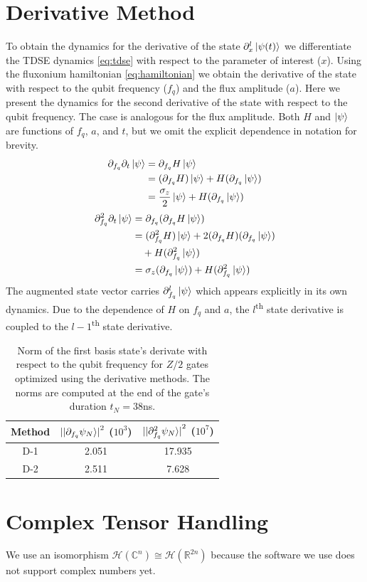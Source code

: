 \documentclass[
  amsfonts,
  amsmath,
  tbtags,
  amssymb,
  aps,
  nobibnotes,
  twocolumn,
  superscriptaddress,
]{revtex4-2}
\begin{document}
\section{Derivative Method}
To obtain the dynamics for the derivative of the state $\partial_{x}^{l} \ket{\psi(t)}$
we differentiate the TDSE dynamics \ref{eq:tdse} with respect to the parameter of interest
($x$). Using the fluxonium hamiltonian \ref{eq:hamiltonian} we obtain the derivative of the
state with respect to the qubit frequency ($f_{q}$) and the flux amplitude ($a$).
Here we present the dynamics for the second derivative of the state with respect to the
qubit frequency. The case is analogous for the flux amplitude. Both $H$ and $\ket{\psi}$ are functions
of $f_{q}$, $a$, and $t$, but we omit the explicit dependence in notation for
brevity.
\begin{equation}
  \begin{aligned}
      \partial_{f_{q}} \partial_{t} \ket{\psi} &= \partial_{f_{q}} H \ket{\psi}\\
      &= (\partial_{f_{q}} H) \ket{\psi} + H (\partial_{f_{q}} \ket{\psi})\\
      &= \frac{\sigma_{z}}{2} \ket{\psi} + H (\partial_{f_{q}} \ket{\psi})
  \end{aligned}
\end{equation}
\begin{equation}
  \begin{aligned}
    \partial_{f_{q}}^{2} \partial_{t} \ket{\psi} &= \partial_{f_{q}} (\partial_{f_{q}} H \ket{\psi})\\
    &= (\partial_{f_{q}}^{2} H) \ket{\psi} + 2 (\partial_{f_{q}} H)(\partial_{f_{q}} \ket{\psi})\\
    &\quad + H (\partial_{f_{q}}^{2} \ket{\psi})\\
    &= \sigma_{z} (\partial_{f_{q}} \ket{\psi}) + H (\partial_{f_{q}}^{2} \ket{\psi})
  \end{aligned}
\end{equation}
The augmented state vector carries $\partial_{f_{q}}^{l} \ket{\psi}$
which appears explicitly in its own dynamics. Due to the dependence of $H$ on $f_{q}$ and $a$,
the $l$\textsuperscript{th} state derivative is coupled to the
$l - 1$\textsuperscript{th} state derivative.

\begin{table}
  \begin{tabular}{c | c | c}
    Method & ${\lvert \ket{\partial_{f_{q}} \psi_{N}} \rvert}^{2}$ ($10^{3}$)
    & ${\lvert \ket{\partial^{2}_{f_{q}} \psi_{N}} \rvert}^{2}$ ($10^{7}$)\\
    \hline
    D-1 & 2.051 & 17.935\\
    D-2 & 2.511 & 7.628\\
  \end{tabular}
  \caption{Norm of the first basis state's derivate with respect to the qubit frequency
    for $Z/2$ gates optimized using the derivative methods. The norms are computed
    at the end of the gate's duration $t_{N} = 38$ns.}
\end{table}


\section{Complex Tensor Handling}
We use an isomorphism $\mathcal{H}(\mathbb{C}^{n}) \cong \mathcal{H}(\mathbb{R}^{2n})$
because the software we use does not support complex numbers yet.



\end{document}
